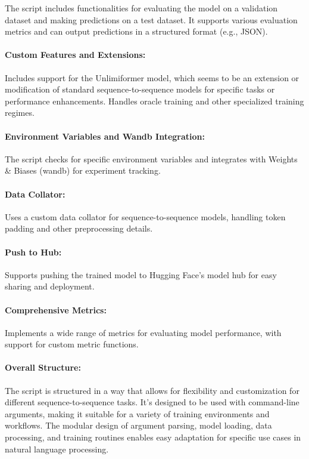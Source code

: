 \documentclass[12pt]{article}
\begin{document}
The script includes functionalities for evaluating the model on a validation
dataset and making predictions on a test dataset. It supports various
evaluation metrics and can output predictions in a structured format (e.g.,
JSON).

\paragraph{Custom Features and Extensions:} Includes support for the
Unlimiformer model, which seems to be an extension or modification of standard
sequence-to-sequence models for specific tasks or performance enhancements.
Handles oracle training and other specialized training regimes.


\paragraph{Environment Variables and Wandb Integration:} The script checks for
specific environment variables and integrates with Weights \& Biases (wandb)
for experiment tracking.

\paragraph{Data Collator:} Uses a custom data collator for sequence-to-sequence
models, handling token padding and other preprocessing details.

\paragraph{Push to Hub:} Supports pushing the trained model to Hugging Face's
model hub for easy sharing and deployment.

\paragraph{Comprehensive Metrics:} Implements a wide range of metrics for
evaluating model performance, with support for custom metric functions.

\paragraph{Overall Structure:} The script is structured in a way that allows
for flexibility and customization for different sequence-to-sequence tasks.
It's designed to be used with command-line arguments, making it suitable for a
variety of training environments and workflows. The modular design of argument
parsing, model loading, data processing, and training routines enables easy
adaptation for specific use cases in natural language processing.
\end{document}
